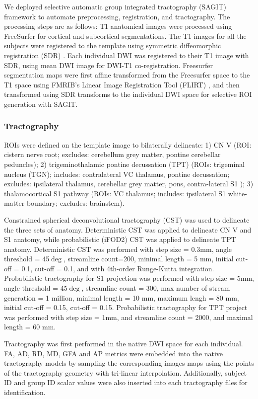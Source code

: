 We deployed selective automatic group integrated tractography (SAGIT) framework to automate preprocessing, registration, and tractography. The processing steps are as follows: T1 anatomical images were processed using FreeSurfer \cite{Fischl2004} for cortical and subcortical segmentations. The T1 images for all the subjects were registered to the template using symmetric diffeomorphic registration (SDR) \cite{Avants2008b}. Each individual DWI was registered to their T1 image with SDR, using mean DWI image for DWI-T1 co-registration. Freesurfer segmentation maps were first affine transformed from the Freesurfer space to the T1 space using FMRIB's Linear Image Registration Tool (FLIRT) \cite{Jenkinson2001,Jenkinson2002}, and then transformed using SDR transforms to the individual DWI space for selective ROI generation with SAGIT.

\subsubsection{Tractography}
ROIs were defined on the template image to bilaterally delineate: 1) CN V (ROI: cistern nerve root; excludes: cerebellum grey matter, pontine cerebellar peduncles); 2) trigeminothalamic pontine decussation (TPT) (ROIs: trigeminal nucleus (TGN); includes: contralateral VC thalamus, pontine decussation; excludes: ipsilateral thalamus, cerebellar grey matter, pons, contra-lateral S1 ); 3) thalamocortical S1 pathway (ROIs: VC thalamus; includes: ipsilateral S1 white-matter boundary; excludes: brainstem).  

Constrained spherical deconvolutional tractography (CST) \cite{Tournier2012b} was used to delineate the three sets of anatomy. Deterministic CST was applied to delineate CN V and S1 anatomy, while probabilistic (iFOD2) CST \cite{Jeurissen2011b,Tournier2010} was applied to delineate TPT anatomy. Deterministic CST was performed with step size = 0.3mm, angle threshold = 45$\deg$, streamline count=200, minimal length = 5 mm, initial cut-off = 0.1, cut-off = 0.1, and with 4th-order Runge-Kutta integration. Probabilistic tractography for S1 projection was performed with step size = 5mm, angle threshold = 45$\deg$, streamline count = 300, max number of stream generation = 1 million, minimal length = 10 mm, maximum lengh = 80 mm, initial cut-off = 0.15, cut-off = 0.15. Probabilistic tractography for TPT project was performed with step size = 1mm, and streamline count = 2000, and maximal length = 60 mm. 

Tractography was first performed in the native DWI space for each individual.  FA, AD, RD, MD, GFA and AP metrics were embedded into the native tractography models by sampling the corresponding images maps using the points of the tractography geometry with tri-linear interpolation. Additionally, subject ID and group ID scalar values were also inserted into each tractography files for identification. 

